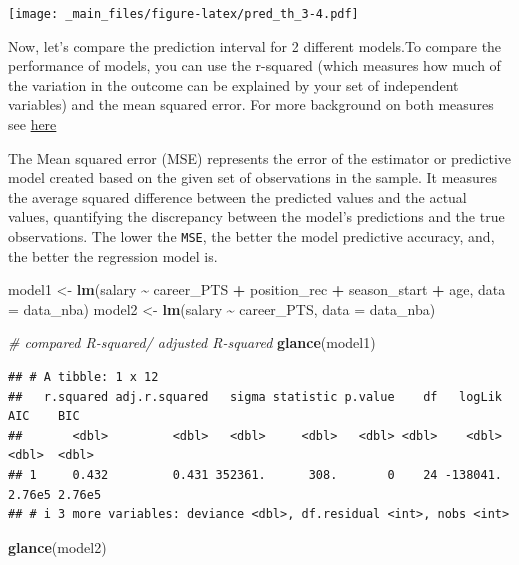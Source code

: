 \documentclass[
]{book}
\newenvironment{Shaded}{\begin{snugshade}}{\end{snugshade}}
\newcommand{\AttributeTok}[1]{\textcolor[rgb]{0.13,0.29,0.53}{#1}}
\newcommand{\CommentTok}[1]{\textcolor[rgb]{0.56,0.35,0.01}{\textit{#1}}}
\newcommand{\FunctionTok}[1]{\textcolor[rgb]{0.13,0.29,0.53}{\textbf{#1}}}
\newcommand{\NormalTok}[1]{#1}
\newcommand{\OtherTok}[1]{\textcolor[rgb]{0.56,0.35,0.01}{#1}}
\newcommand{\SpecialCharTok}[1]{\textcolor[rgb]{0.81,0.36,0.00}{\textbf{#1}}}
\begin{document}
\texttt{[image: \_main\_files/figure-latex/pred\_th\_3-4.pdf]}

Now, let's compare the prediction interval for 2 different models.To compare the performance of models, you can use the r-squared (which measures how much of the variation in the outcome can be explained by your set of independent variables) and the mean squared error. For more background on both measures see \href{https://vitalflux.com/mean-square-error-r-squared-which-one-to-use/}{here}

The Mean squared error (MSE) represents the error of the estimator or predictive model created based on the given set of observations in the sample. It measures the average squared difference between the predicted values and the actual values, quantifying the discrepancy between the model's predictions and the true observations. The lower the \texttt{MSE}, the better the model predictive accuracy, and, the better the regression model is.

\begin{Shaded}
\begin{Highlighting}[]
\NormalTok{model1 }\OtherTok{\textless{}{-}} \FunctionTok{lm}\NormalTok{(salary }\SpecialCharTok{\textasciitilde{}}\NormalTok{ career\_PTS }\SpecialCharTok{+}\NormalTok{ position\_rec }\SpecialCharTok{+}\NormalTok{ season\_start }\SpecialCharTok{+}
\NormalTok{             age, }\AttributeTok{data =}\NormalTok{ data\_nba)}
\NormalTok{model2 }\OtherTok{\textless{}{-}} \FunctionTok{lm}\NormalTok{(salary }\SpecialCharTok{\textasciitilde{}}\NormalTok{ career\_PTS, }\AttributeTok{data =}\NormalTok{ data\_nba)}

\CommentTok{\# compared R{-}squared/ adjusted R{-}squared}
\FunctionTok{glance}\NormalTok{(model1)}
\end{Highlighting}
\end{Shaded}

\begin{verbatim}
## # A tibble: 1 x 12
##   r.squared adj.r.squared   sigma statistic p.value    df   logLik    AIC    BIC
##       <dbl>         <dbl>   <dbl>     <dbl>   <dbl> <dbl>    <dbl>  <dbl>  <dbl>
## 1     0.432         0.431 352361.      308.       0    24 -138041. 2.76e5 2.76e5
## # i 3 more variables: deviance <dbl>, df.residual <int>, nobs <int>
\end{verbatim}

\begin{Shaded}
\begin{Highlighting}[]
\FunctionTok{glance}\NormalTok{(model2)}
\end{Highlighting}
\end{Shaded}
\end{document}
